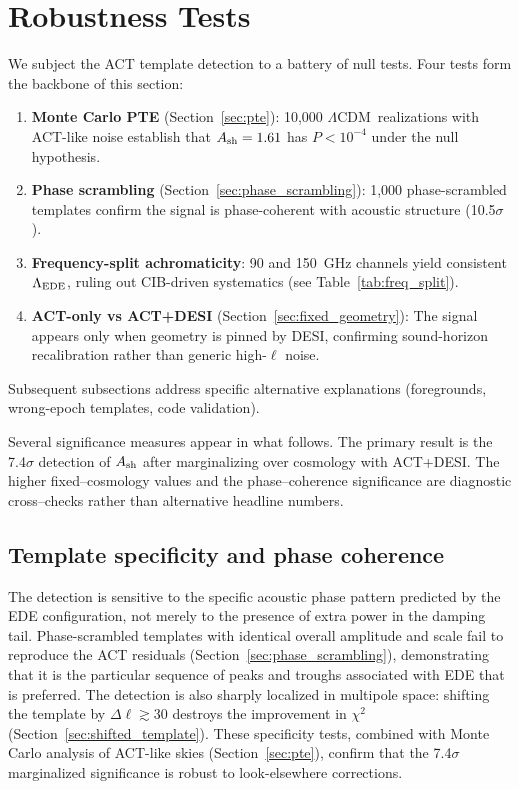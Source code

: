 \documentclass[twocolumn,showpacs,preprintnumbers,amsmath,amssymb,prd]{revtex4-2}
\newcommand{\lcdm}{$\Lambda$CDM}
\begin{document}
\section{Robustness Tests}
\label{sec:robust}

We subject the ACT template detection to a battery of null tests. Four 
tests form the backbone of this section:
\begin{enumerate}
\item \textbf{Monte Carlo PTE} (Section~\ref{sec:pte}): 10,000 \lcdm\ 
realizations with ACT-like noise establish that $A_{\rm sh} = 1.61$ has 
$P < 10^{-4}$ under the null hypothesis.
\item \textbf{Phase scrambling} (Section~\ref{sec:phase_scrambling}): 
1,000 phase-scrambled templates confirm the signal is phase-coherent 
with acoustic structure (10.5$\sigma$).
\item \textbf{Frequency-split achromaticity}: 
90 and 150~GHz channels yield consistent $\Lambda_{\rm EDE}$, ruling out 
CIB-driven systematics (see Table~\ref{tab:freq_split}).
\item \textbf{ACT-only vs ACT+DESI} (Section~\ref{sec:fixed_geometry}): 
The signal appears only when geometry is pinned by DESI, confirming 
sound-horizon recalibration rather than generic high-$\ell$ noise.
\end{enumerate}
Subsequent subsections address specific alternative explanations 
(foregrounds, wrong-epoch templates, code validation).

Several significance measures appear in what follows. The primary result is the 7.4$\sigma$ 
detection of $A_{\rm sh}$ after marginalizing over cosmology with ACT+DESI. The higher 
fixed--cosmology values and the phase--coherence significance are diagnostic cross--checks 
rather than alternative headline numbers.

\subsection{Template specificity and phase coherence}

The detection is sensitive to the specific acoustic phase pattern predicted 
by the EDE configuration, not merely to the presence of extra power in the 
damping tail. Phase-scrambled templates with identical overall amplitude and 
scale fail to reproduce the ACT residuals (Section~\ref{sec:phase_scrambling}), 
demonstrating that it is the particular sequence of peaks and troughs 
associated with EDE that is preferred. The detection is also sharply 
localized in multipole space: shifting the template by $\Delta\ell \gtrsim 30$ 
destroys the improvement in $\chi^2$ (Section~\ref{sec:shifted_template}). 
These specificity tests, combined with Monte Carlo analysis of ACT-like skies 
(Section~\ref{sec:pte}), confirm that the 7.4$\sigma$ marginalized significance 
is robust to look-elsewhere corrections.
\end{document}
